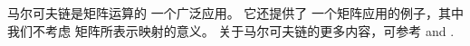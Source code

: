 \begin{center}
\begin{tabular}{@{}r|c@{\markovspacer}c@{\markovspacer}c@{\markovspacer}c@{\markovspacer}c@{\markovspacer}c@{\markovspacer}c@{\markovspacer}c@{}}
\end{tabular}
\end{center}

马尔可夫链是矩阵运算的
一个广泛应用。
它还提供了
一个矩阵应用的例子，其中我们不考虑
矩阵所表示映射的意义。
关于马尔可夫链的更多内容，可参考
\cite{KemenySnell} and \cite{Iosifescu}.

